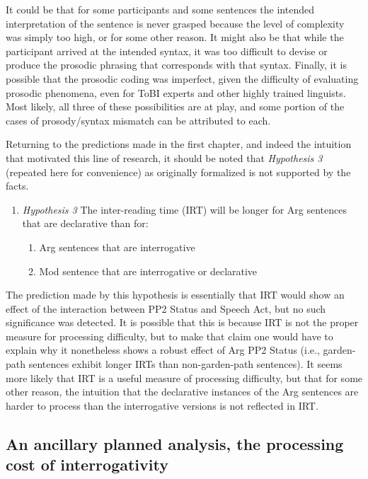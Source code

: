 \documentclass[11pt,oneside]{book}
\providecommand{\tightlist}{%
  \setlength{\itemsep}{0pt}\setlength{\parskip}{0pt}}
\begin{document}
It could be that for some participants and some sentences the intended interpretation of the sentence is never grasped because the level of complexity was simply too high, or for some other reason. It might also be that while the participant arrived at the intended syntax, it was too difficult to devise or produce the prosodic phrasing that corresponds with that syntax. Finally, it is possible that the prosodic coding was imperfect, given the difficulty of evaluating prosodic phenomena, even for ToBI experts and other highly trained linguists. Most likely, all three of these possibilities are at play, and some portion of the cases of prosody/syntax mismatch can be attributed to each.

Returning to the predictions made in the first chapter, and indeed the intuition that motivated this line of research, it should be noted that \emph{Hypothesis 3} (repeated here for convenience) as originally formalized is not supported by the facts.

\begin{enumerate}
\def\labelenumi{(\arabic{enumi})}
\setcounter{enumi}{43}
\tightlist
\item
  \emph{Hypothesis 3}
  The inter-reading time (IRT) will be longer for Arg sentences that are declarative than for:

  \begin{enumerate}
  \def\labelenumii{\alph{enumii}.}
  \tightlist
  \item
    Arg sentences that are interrogative
  \item
    Mod sentence that are interrogative or declarative
  \end{enumerate}
\end{enumerate}

The prediction made by this hypothesis is essentially that IRT would show an effect of the interaction between PP2 Status and Speech Act, but no such significance was detected. It is possible that this is because IRT is not the proper measure for processing difficulty, but to make that claim one would have to explain why it nonetheless shows a robust effect of Arg PP2 Status (i.e., garden-path sentences exhibit longer IRTs than non-garden-path sentences). It seems more likely that IRT is a useful measure of processing difficulty, but that for some other reason, the intuition that the declarative instances of the Arg sentences are harder to process than the interrogative versions is not reflected in IRT.

\hypertarget{qslow}{%
\subsection{An ancillary planned analysis, the processing cost of interrogativity}\label{qslow}}
\end{document}
